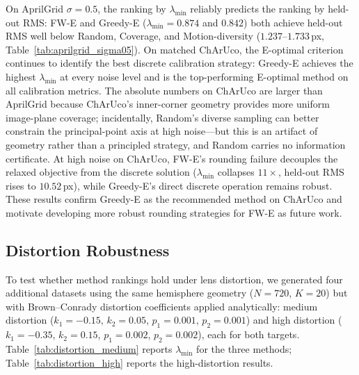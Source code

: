 \documentclass[11pt]{article}
\begin{document}
On AprilGrid $\sigma{=}0.5$, the ranking by $\lambda_{\min}$ reliably predicts
the ranking by held-out RMS: FW-E and Greedy-E ($\lambda_{\min}{=}0.874$ and
$0.842$) both achieve held-out RMS well below Random, Coverage, and
Motion-diversity ($1.237$--$1.733$\,px, Table~\ref{tab:aprilgrid_sigma05}).
On matched ChArUco, the E-optimal criterion continues to identify the best
discrete calibration strategy: Greedy-E achieves the highest $\lambda_{\min}$
at every noise level and is the top-performing E-optimal method on all
calibration metrics.
The absolute numbers on ChArUco are larger than AprilGrid because ChArUco's
inner-corner geometry provides more uniform image-plane coverage; incidentally,
Random's diverse sampling can better constrain the principal-point axis at high
noise---but this is an artifact of geometry rather than a principled strategy,
and Random carries no information certificate.
At high noise on ChArUco, FW-E's rounding failure decouples the
relaxed objective from the discrete solution ($\lambda_{\min}$ collapses
$11{\times}$, held-out RMS rises to $10.52$\,px), while Greedy-E's
direct discrete operation remains robust.
These results confirm Greedy-E as the recommended method on ChArUco and
motivate developing more robust rounding strategies for FW-E as future work.

\subsection{Distortion Robustness}
\label{subsec:distortion}

To test whether method rankings hold under lens distortion, we generated four
additional datasets using the same hemisphere geometry ($N{=}720$, $K{=}20$)
but with Brown--Conrady distortion coefficients applied analytically:
medium distortion ($k_1{=}{-}0.15$, $k_2{=}0.05$, $p_1{=}0.001$, $p_2{=}0.001$)
and high distortion ($k_1{=}{-}0.35$, $k_2{=}0.15$, $p_1{=}0.002$, $p_2{=}0.002$),
each for both targets.
Table~\ref{tab:distortion_medium} reports $\lambda_{\min}$ for the three methods;
Table~\ref{tab:distortion_high} reports the high-distortion results.
\end{document}
